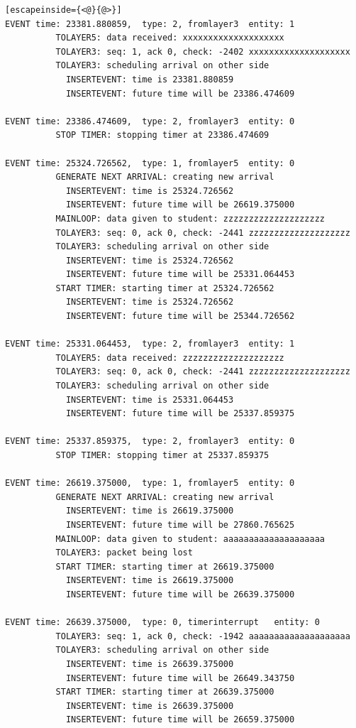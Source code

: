 \documentclass[paper=a4, fontsize=11pt]{scrartcl}
\numberwithin{equation}{section}		%
\numberwithin{figure}{section}			%
\numberwithin{table}{section}				%
\begin{document}
\begin{lstlisting}[escapeinside={<@}{@>}]
EVENT time: 23381.880859,  type: 2, fromlayer3  entity: 1
          TOLAYER5: data received: xxxxxxxxxxxxxxxxxxxx
          TOLAYER3: seq: 1, ack 0, check: -2402 xxxxxxxxxxxxxxxxxxxx
          TOLAYER3: scheduling arrival on other side
            INSERTEVENT: time is 23381.880859
            INSERTEVENT: future time will be 23386.474609

EVENT time: 23386.474609,  type: 2, fromlayer3  entity: 0
          STOP TIMER: stopping timer at 23386.474609

EVENT time: 25324.726562,  type: 1, fromlayer5  entity: 0
          GENERATE NEXT ARRIVAL: creating new arrival
            INSERTEVENT: time is 25324.726562
            INSERTEVENT: future time will be 26619.375000
          MAINLOOP: data given to student: zzzzzzzzzzzzzzzzzzzz
          TOLAYER3: seq: 0, ack 0, check: -2441 zzzzzzzzzzzzzzzzzzzz
          TOLAYER3: scheduling arrival on other side
            INSERTEVENT: time is 25324.726562
            INSERTEVENT: future time will be 25331.064453
          START TIMER: starting timer at 25324.726562
            INSERTEVENT: time is 25324.726562
            INSERTEVENT: future time will be 25344.726562

EVENT time: 25331.064453,  type: 2, fromlayer3  entity: 1
          TOLAYER5: data received: zzzzzzzzzzzzzzzzzzzz
          TOLAYER3: seq: 0, ack 0, check: -2441 zzzzzzzzzzzzzzzzzzzz
          TOLAYER3: scheduling arrival on other side
            INSERTEVENT: time is 25331.064453
            INSERTEVENT: future time will be 25337.859375

EVENT time: 25337.859375,  type: 2, fromlayer3  entity: 0
          STOP TIMER: stopping timer at 25337.859375

EVENT time: 26619.375000,  type: 1, fromlayer5  entity: 0
          GENERATE NEXT ARRIVAL: creating new arrival
            INSERTEVENT: time is 26619.375000
            INSERTEVENT: future time will be 27860.765625
          MAINLOOP: data given to student: aaaaaaaaaaaaaaaaaaaa
          TOLAYER3: packet being lost
          START TIMER: starting timer at 26619.375000
            INSERTEVENT: time is 26619.375000
            INSERTEVENT: future time will be 26639.375000

EVENT time: 26639.375000,  type: 0, timerinterrupt   entity: 0
          TOLAYER3: seq: 1, ack 0, check: -1942 aaaaaaaaaaaaaaaaaaaa
          TOLAYER3: scheduling arrival on other side
            INSERTEVENT: time is 26639.375000
            INSERTEVENT: future time will be 26649.343750
          START TIMER: starting timer at 26639.375000
            INSERTEVENT: time is 26639.375000
            INSERTEVENT: future time will be 26659.375000


\end{lstlisting}
\end{document}
